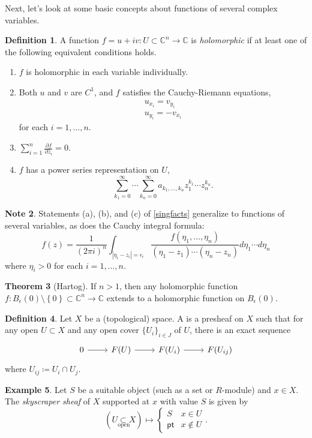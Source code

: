 \documentclass[10pt,letterpaper,cm]{nupset}
\theoremstyle{definition}
\newtheorem{defn}{Definition}[subsection]
\newtheorem{exmp}[defn]{Example}
\newtheorem{note}[defn]{Note}
\theoremstyle{theorem}
\newtheorem{theorem}[defn]{Theorem}
\theoremstyle{remark}
\newcommand{\C}{\mathbb C}
\newcommand{\1}{\mathbb{1}}
\newcommand{\0}{\vec 0}
\newcommand{\pt}{\mathsf{pt}}
\newcommand{\be}{\begin{enumerate}}
\newcommand{\ee}{\end{enumerate}}
\begin{document}
\medskip

Next, let's look at some basic concepts about functions of several complex variables.

\begin{defn}
A function $f = u +iv: U\subset \C^n \to \C$ is \textit{holomorphic} if at least one of  the following equivalent conditions holds.
\be[label=(\roman*)]
\item $f$ is holomorphic in each variable individually.
\item  Both $u$ and $v$ are $C^1$, and $f$ satisfies the Cauchy-Riemann equations,
\begin{gather*}
u_{x_i}  = v_{y_i}
\\ u_{y_i}  = {-v_{x_i}}
\end{gather*}
for each $i=1, \ldots, n$.
\item $\sum_{i=1}^n\frac{\partial{f}}{\partial{\bar{z}_i}} =0$.
\item $f$ has a power series representation on $U$,
\[
\sum_{k_1=0}^{\infty}\cdots \sum_{k_n=0}^{\infty} a_{k_1, \ldots, k_n}z_1^{k_1}\cdots z_n^{k_n}.
\]
\ee
\end{defn}

\begin{note}
Statements (a), (b), and (c) of \cref{singfacts} generalize to functions of several variables, as does the Cauchy integral formula:
\[
f(z) = \frac{1}{(2\pi i)^n} \int_{\left\lvert{\eta_i - z_i}\right\rvert = \epsilon_i} \frac{f(\eta_1, \ldots, \eta_n)}{(\eta_1 - z_1)\cdots (\eta_n - z_n)}d{\eta_1}\cdots d{\eta_n}
\] where $\eta_i >0$ for each $i=1, \ldots, n$.
\end{note}

\begin{theorem}[Hartog]
If $n>1$, then any holomorphic function $f: B_{\epsilon}(0)\setminus \left\{0\right\} \subset \C^n \to \C$ extends to a holomorphic function on $B_{\epsilon}(0)$.
\end{theorem}

\begin{defn} Let $X$ be a (topological) space. A  is a presheaf on $X$ such that for any open $U\subset X$ and any open cover $\{U_i\}_{i\in J}$ of $U$, there is an exact sequence
\[
\begin{tikzcd}
0 \arrow[r] & F(U) \arrow[r] & F(U_i) \arrow[r] & F(U_{ij})
\end{tikzcd}
\] where $U_{ij} \coloneqq U_i \cap U_j$.
\end{defn}

\begin{exmp}
Let $S$ be a suitable object (such as a set or $R$-module)  and $x\in X$. The \textit{skyscraper sheaf} of $X$ supported at $x$ with value $S$ is given by
\[
\left(\underset{\text{open}}{U \subset X}\right) \mapsto \begin{cases}
S & x\in U
\\ \pt & x\notin U
\end{cases}.
\]
\end{exmp}
\end{document}
